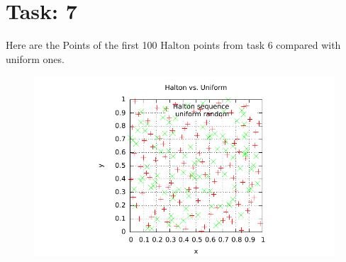 \documentclass{article}
\begin{document}
\newpage
\section*{Task: 7}
Here are the Points of the first 100 Halton points from task 6 compared with uniform ones.
\begin{figure}[htbp]
  \centering
     \includegraphics[width=1.0\textwidth]{../Task07/sh3_task7_point_plot.pdf}
\end{figure}
\end{document}
